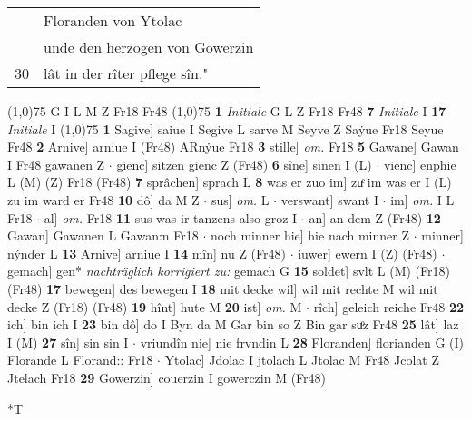 \documentclass[8pt,a4paper,notitlepage]{article}
\begin{document}
\begin{table}[ht]
\begin{minipage}[t]{0.5\linewidth}
\begin{tabular}{rl}
 & Floranden von Ytolac\\ 
 & unde den herzogen von Gowerzin\\ 
30 & lât in der rîter pflege sîn."\\ 
\end{tabular}
\scriptsize
\line(1,0){75} \newline
G I L M Z Fr18 Fr48 \newline
\line(1,0){75} \newline
\textbf{1} \textit{Initiale} G L Z Fr18 Fr48  \textbf{7} \textit{Initiale} I  \textbf{17} \textit{Initiale} I  \newline
\line(1,0){75} \newline
\textbf{1} Sagive] saiue I Segive L sarve M Seyve Z Saẏue Fr18 Seyue Fr48 \textbf{2} Arnive] arniue I (Fr48) ARnẏue Fr18 \textbf{3} stille] \textit{om.} Fr18 \textbf{5} Gawane] Gawan I Fr48 gawanen Z  $\cdot$ gienc] sitzen gienc Z (Fr48) \textbf{6} sîne] sinen I (L)  $\cdot$ vienc] enphie L (M) (Z) Fr18 (Fr48) \textbf{7} sprâchen] sprach L \textbf{8} was er zuo im] zuͤ im was er I (L) zu im ward er Fr48 \textbf{10} dô] da M Z  $\cdot$ sus] \textit{om.} L  $\cdot$ verswant] swant I  $\cdot$ im] \textit{om.} I L Fr18  $\cdot$ al] \textit{om.} Fr18 \textbf{11} sus was ir tanzens also groz I  $\cdot$ an] an dem Z (Fr48) \textbf{12} Gawan] Gawanen L Gawan:n Fr18  $\cdot$ noch minner hie] hie nach minner Z  $\cdot$ minner] nýnder L \textbf{13} Arnive] arniue I \textbf{14} mîn] nu Z (Fr48)  $\cdot$ iuwer] ewern I (Z) (Fr48)  $\cdot$ gemach] gen* \textit{nachträglich korrigiert zu:} gemach G \textbf{15} soldet] svlt L (M) (Fr18) (Fr48) \textbf{17} bewegen] des bewegen I \textbf{18} mit decke wil] wil mit rechte M wil mit decke Z (Fr18) (Fr48) \textbf{19} hînt] hute M \textbf{20} ist] \textit{om.} M  $\cdot$ rîch] geleich reiche Fr48 \textbf{22} ich] bin ich I \textbf{23} bin dô] do I Byn da M Gar bin so Z Bin gar suͦz Fr48 \textbf{25} lât] laz I (M) \textbf{27} sîn] sin sin I  $\cdot$ vriundîn nie] nie frvndin L \textbf{28} Floranden] florianden G (I) Florande L Florand:: Fr18  $\cdot$ Ytolac] Jdolac I jtolach L Jtolac M Fr48 Jcolat Z Jtelach Fr18 \textbf{29} Gowerzin] couerzin I gowerczin M (Fr48) \newline
\end{minipage}
\hspace{0.5cm}
\begin{minipage}[t]{0.5\linewidth}
\small
\begin{center}*T
\end{center}
\begin{tabular}{rl}

\end{tabular}
\end{minipage}
\end{table}
\end{document}
